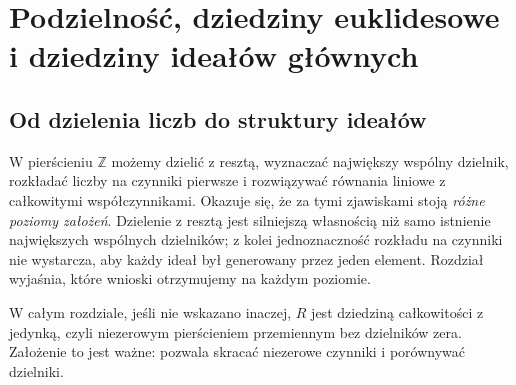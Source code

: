 \chapter[Podzielność i dziedziny ideałów głównych]{Podzielność, dziedziny euklidesowe i dziedziny ideałów głównych}
\label{aa:ch:podzielnosc}
\setlength{\parskip}{2.8pt}

\section{Od dzielenia liczb do struktury ideałów}
W pierścieniu $\mathbb Z$ możemy dzielić z resztą, wyznaczać
największy wspólny dzielnik, rozkładać liczby na czynniki
pierwsze i rozwiązywać równania liniowe z całkowitymi
współczynnikami. Okazuje się, że za tymi zjawiskami stoją
\emph{różne poziomy założeń}. Dzielenie z resztą jest
silniejszą własnością niż samo istnienie największych wspólnych
dzielników; z kolei jednoznaczność rozkładu na czynniki
nie wystarcza, aby każdy ideał był generowany przez jeden element.
Rozdział wyjaśnia, które wnioski otrzymujemy na każdym poziomie.

W całym rozdziale, jeśli nie wskazano inaczej, $R$ jest
dziedziną całkowitości z jedynką, czyli niezerowym pierścieniem
przemiennym bez dzielników zera. Założenie to jest ważne:
pozwala skracać niezerowe czynniki i porównywać dzielniki.

